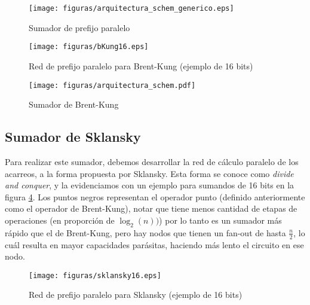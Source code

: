 \begin{figure}[h]
  \centering
\texttt{[image: figuras/arquitectura\_schem\_generico.eps]}
  \caption{Sumador de prefijo paralelo}
  \label{fig:ppadder}
\end{figure}

\begin{figure}[h!]
\vspace{-5pt}
  \centering
\texttt{[image: figuras/bKung16.eps]}
  \caption{Red de prefijo paralelo para Brent-Kung (ejemplo de 16 bits)}
\label{bKung16}
\vspace{-10pt}
\end{figure}

\begin{figure}[h]
  \centering
\texttt{[image: figuras/arquitectura\_schem.pdf]}
  \caption{Sumador de Brent-Kung}
  \label{fig:bkungadder}
\end{figure}

\subsection{Sumador de Sklansky}\label{subsec:sklansky}
Para realizar este sumador, debemos desarrollar la red de cálculo paralelo de los acarreos, a la forma propuesta por Sklansky. Esta forma se conoce como \emph{divide and conquer}, y la evidenciamos con un ejemplo para sumandos de 16 bits en la figura \ref{fig:sklansky16}. Los puntos negros representan el operador punto (definido anteriormente como el operador de Brent-Kung), notar que tiene menos cantidad de etapas de operaciones (en proporción de $\log_2(n))$) por lo tanto es un sumador más rápido que el de Brent-Kung, pero hay nodos que tienen un fan-out de hasta $\frac{n}{2}$, lo cuál resulta en mayor capacidades parásitas, haciendo más lento el circuito en ese nodo.

\begin{figure}[h!]
\vspace{-5pt}
  \centering
\texttt{[image: figuras/sklansky16.eps]}
  \caption{Red de prefijo paralelo para Sklansky (ejemplo de 16 bits)}
\label{fig:sklansky16}
\vspace{-10pt}
\end{figure}
